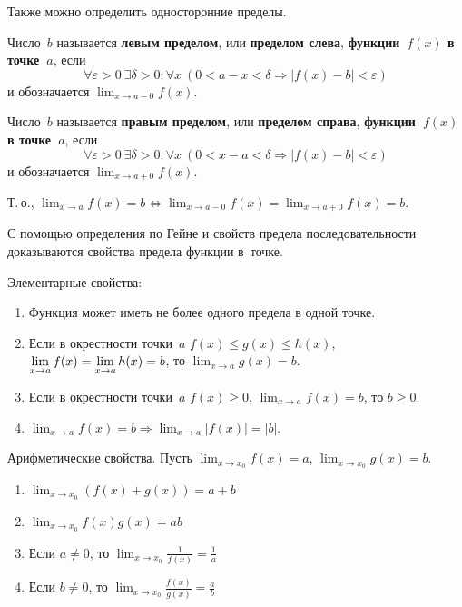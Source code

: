 Также можно определить односторонние пределы.

Число~$b$ называется \textbf{левым пределом}, или \textbf{пределом слева}, \textbf{функции~$f(x)$ в точке~$a$}, если
\begin{equation*}
\forall \varepsilon > 0 \ \exists \delta > 0 \colon \forall x \ (0 < a - x < \delta \Rightarrow |f(x) - b| < \varepsilon)
\end{equation*}
и обозначается $\displaystyle \lim_{x \to a-0} f(x)$.

Число~$b$ называется \textbf{правым пределом}, или \textbf{пределом справа}, \textbf{функции~$f(x)$ в точке~$a$}, если
\begin{equation*}
\forall \varepsilon > 0 \ \exists \delta > 0 \colon \forall x \ (0 < x - a < \delta \Rightarrow |f(x) - b| < \varepsilon)
\end{equation*}
и обозначается $\displaystyle \lim_{x \to a+0} f(x)$.

Т.\,о., $\displaystyle \lim_{x \to a} f(x) = b \Leftrightarrow \lim_{x \to a-0} f(x) = \lim_{x \to a+0} f(x) = b$.

С помощью определения по Гейне и свойств предела последовательности доказываются свойства предела функции в~точке.

Элементарные свойства:
\begin{enumerate}
	\item Функция может иметь не более одного предела в одной точке.
	\item \begin{theorem}
	\label{th:about_two_policemen}
	Если в окрестности точки~$a$ $f(x) \leqslant g(x) \leqslant h(x)$, $\displaystyle \lim_{x \to a} f(x) \opbr= \lim_{x \to a} h(x) \opbr= b$, то $\displaystyle \lim_{x \to a} g(x) = b$.
	\end{theorem}
	\item Если в окрестности точки~$a$ $f(x) \geqslant 0$, $\displaystyle \lim_{x \to a} f(x) = b$, то $b \geqslant 0$.
	\item $\displaystyle \lim_{x \to a} f(x) = b \Rightarrow \lim_{x \to a} |f(x)| = |b|$.
\end{enumerate}

Арифметические свойства.
Пусть $\displaystyle \lim_{x \to x_0} f(x) = a$, $\displaystyle \lim_{x \to x_0} g(x) = b$.
\begin{enumerate}
	\item $\displaystyle \lim_{x \to x_0} (f(x) + g(x)) = a + b$
	\item $\displaystyle \lim_{x \to x_0} f(x)g(x) = ab$
	\item Если $a \neq 0$, то $\displaystyle \lim_{x \to x_0} \frac1{f(x)} = \frac1a$
	\item Если $b \neq 0$, то $\displaystyle \lim_{x \to x_0} \frac{f(x)}{g(x)} = \frac{a}b$
\end{enumerate}

